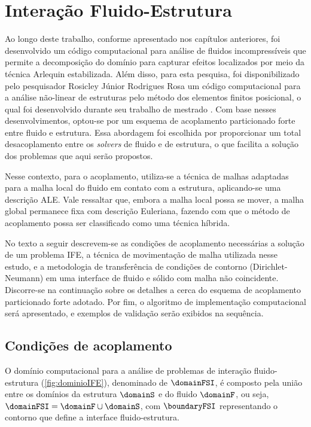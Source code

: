 \chapter[Acoplamento Fluido-Estrutura]{Interação Fluido-Estrutura} \label{capitulo:Cap7}

Ao longo deste trabalho, conforme apresentado nos capítulos anteriores, foi desenvolvido um código computacional para análise de fluidos incompressíveis que permite a decomposição do domínio para capturar efeitos localizados por meio da técnica Arlequin estabilizada. Além disso, para esta pesquisa, foi disponibilizado pelo pesquisador Rosicley Júnior Rodrigues Rosa um código computacional para a análise não-linear de estruturas pelo método dos elementos finitos posicional, o qual foi desenvolvido durante seu trabalho de mestrado \cite{Rosa:2021}. Com base nesses desenvolvimentos, optou-se por um esquema de acoplamento particionado forte entre fluido e estrutura. Essa abordagem foi escolhida por proporcionar um total desacoplamento entre os \textit{solvers} de fluido e de estrutura, o que facilita a solução dos problemas que aqui serão propostos.

Nesse contexto, para o acoplamento, utiliza-se a técnica de malhas adaptadas para a malha local do fluido em contato com a estrutura, aplicando-se uma descrição ALE. Vale ressaltar que, embora a malha local possa se mover, a malha global permanece fixa com descrição Euleriana, fazendo com que o método de acoplamento possa ser classificado como uma técnica híbrida.
 
No texto a seguir descrevem-se as condições de acoplamento necessárias a solução de um problema IFE, a técnica de movimentação de malha utilizada nesse estudo, e a metodologia de transferência de condições de contorno (Dirichlet-Neumann) em uma interface de fluido e sólido com malha não coincidente. Discorre-se na continuação sobre os detalhes a cerca do esquema de acoplamento particionado forte adotado. Por fim, o algoritmo de implementação computacional será apresentado, e exemplos de validação serão exibidos na sequência.

\section{Condições de acoplamento}

O domínio computacional para a análise de problemas de interação fluido-estrutura (\autoref{fig:dominioIFE}), denominado de $\domainFSI$, é composto pela união entre os domínios da estrutura $\domainS$ e do fluido $\domainF$, ou seja, $\domainFSI = \domainF \cup \domainS$, com $\boundaryFSI$ representando o contorno que define a interface fluido-estrutura.

